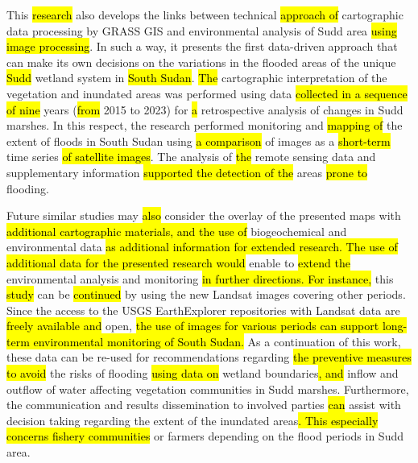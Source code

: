 \documentclass[sustainability,article,submit,pdftex,moreauthors]{Definitions/mdpi}
\begin{document}
This \hl{research} also develops the links between technical \hl{approach of }cartographic data processing by GRASS GIS and\hl{ }environmental analysis of Sudd area \hl{using image processing}. In such a way, it presents the first data-driven approach that can make its own decisions on the variations in the flooded areas of the unique \hl{Sudd }wetland system in \hl{South Sudan}. \hl{The }cartographic interpretation of the vegetation and inundated areas was performed using data \hl{collected in a sequence of nine} years (\hl{from }2015 to 2023) for \hl{a }retrospective analysis of changes in Sudd marshes. In this respect, the research performed monitoring and \hl{mapping of }the extent of floods in South Sudan using \hl{a comparison} of images\hl{ }as a\hl{ short-term }time series \hl{of satellite images}. The analysis of \hl{the }remote sensing data and supplementary information\hl{ supported the detection of the }areas \hl{prone to }flooding. 

Future similar studies may \hl{also }consider the overlay of the presented maps with \hl{additional cartographic materials, and the use of }biogeochemical and environmental data \hl{as additional information for extended research. The use of additional data for the presented research would }enable to \hl{extend the} environmental analysis and monitoring \hl{in further directions. For instance, }this \hl{study} can be \hl{continued} by using the new Landsat images covering other periods.\hl{ }Since the access to the USGS EarthExplorer repositories with Landsat data\hl{ }are \hl{freely available and }open, \hl{the use of images for various periods can support long-term environmental monitoring of South Sudan. }As a continuation of this work, these data can be re-used for\hl{ }recommendations regarding \hl{the preventive measures to avoid }the risks of flooding \hl{using data on} wetland boundaries\hl{, and} inflow and outflow of water affecting vegetation communities in Sudd marshes. Furthermore, the communication and results dissemination to involved parties\hl{ can }assist with decision taking regarding the extent of the inundated areas\hl{. This especially concerns fishery communities } or farmers depending on the flood periods\hl{ }in Sudd area. 




\end{document}
